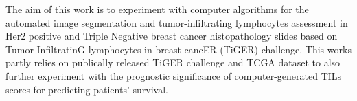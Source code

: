 The aim of this work is to experiment with computer algorithms for the automated image segmentation and tumor-infiltrating
lymphocytes assessment in Her2 positive
and Triple Negative breast cancer histopathology slides based on Tumor InfiltratinG lymphocytes in
breast cancER (TiGER) challenge. This works partly relies on publically
released TiGER challenge and TCGA dataset to also further experiment with the prognostic significance of computer-generated TILs scores
for predicting patients' survival.